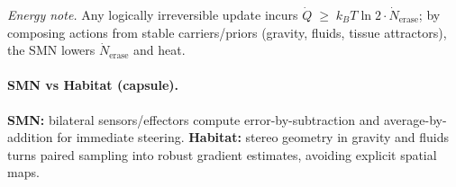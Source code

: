 \noindent\emph{Energy note.} Any logically irreversible update incurs
$\dot Q \;\ge\; k_B T \ln 2 \cdot \dot N_{\text{erase}}$;
by composing actions from stable carriers/priors (gravity, fluids, tissue attractors), the SMN lowers $\dot N_{\text{erase}}$ and heat.


\paragraph{SMN vs Habitat (capsule).}
\textbf{SMN:} bilateral sensors/effectors compute error-by-subtraction and average-by-addition for immediate steering.
\textbf{Habitat:} stereo geometry in gravity and fluids turns paired sampling into robust gradient estimates, avoiding explicit spatial maps.
